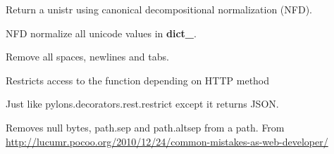 \documentclass[letterpaper,10pt,english]{sphinxmanual}
\begin{document}

\begin{fulllineitems}
\label{api:old.lib.utils.normalize}
Return a unistr using canonical decompositional normalization (NFD).

\end{fulllineitems}


\begin{fulllineitems}
\label{api:old.lib.utils.normalizeDict}
NFD normalize all unicode values in {\color{red}\bfseries{}dict\_}.

\end{fulllineitems}


\begin{fulllineitems}
\label{api:old.lib.utils.removeAllWhiteSpace}
Remove all spaces, newlines and tabs.

\end{fulllineitems}


\begin{fulllineitems}
\label{api:old.lib.utils.restrict}
Restricts access to the function depending on HTTP method

Just like pylons.decorators.rest.restrict except it returns JSON.

\end{fulllineitems}


\begin{fulllineitems}
\label{api:old.lib.utils.secureFilename}
Removes null bytes, path.sep and path.altsep from a path.
From \href{http://lucumr.pocoo.org/2010/12/24/common-mistakes-as-web-developer/}{http://lucumr.pocoo.org/2010/12/24/common-mistakes-as-web-developer/}

\end{fulllineitems}
\end{document}
